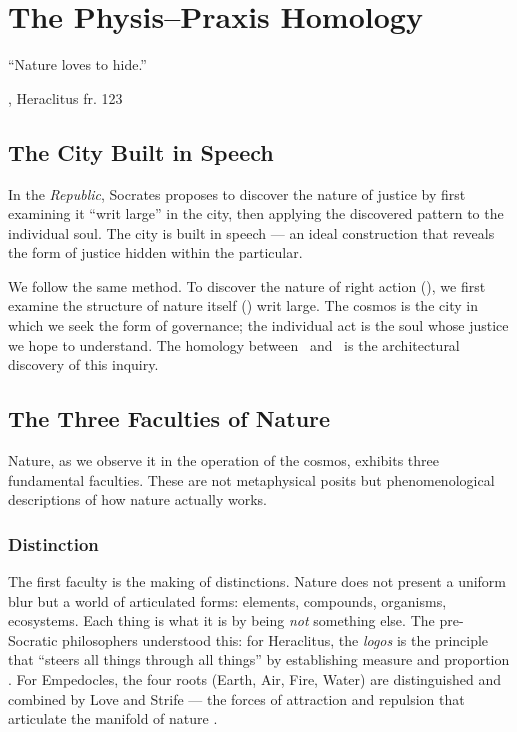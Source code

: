 \chapter{The Physis--Praxis Homology}

\epigraph{``Nature loves to hide.''}{\textcite{kirk1983presocratic}, Heraclitus fr. 123}

\section{The City Built in Speech}

In the \emph{Republic}, Socrates proposes to discover the nature of justice by
first examining it ``writ large'' in the city, then applying the discovered
pattern to the individual soul. The city is built in speech --- an ideal
construction that reveals the form of justice hidden within the particular.

We follow the same method. To discover the nature of right action (\praxis),
we first examine the structure of nature itself (\physis) writ large. The cosmos
is the city in which we seek the form of governance; the individual act is the
soul whose justice we hope to understand. The homology between \physis\ and
\praxis\ is the architectural discovery of this inquiry.

\section{The Three Faculties of Nature}

Nature, as we observe it in the operation of the cosmos, exhibits three
fundamental faculties. These are not metaphysical posits but phenomenological
descriptions of how nature actually works.

\subsection{Distinction}

The first faculty is the making of distinctions. Nature does not present a
uniform blur but a world of articulated forms: elements, compounds, organisms,
ecosystems. Each thing is what it is by being \emph{not} something else. The
pre-Socratic philosophers understood this: for Heraclitus, the \emph{logos} is
the principle that ``steers all things through all things'' by establishing
measure and proportion \parencite{kirk1983presocratic}. For Empedocles, the four roots (Earth, Air, Fire, Water)
are distinguished and combined by Love and Strife --- the forces of attraction
and repulsion that articulate the manifold of nature \parencite{kirk1983presocratic}.

